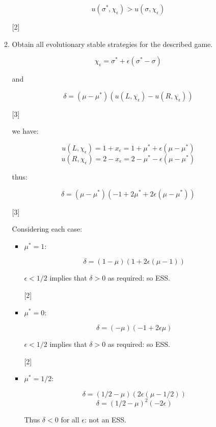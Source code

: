 \documentclass[12pt,a4paper]{article}
\begin{document}
\begin{enumerate}
\begin{enumerate}
                $$u(\sigma^*,\chi_\epsilon)>u(\sigma,\chi_\epsilon)$$

                \hfill{[2]}

            \item Obtain all evolutionary stable strategies for the described game.

                \[\chi_{\epsilon}=\sigma^*+\epsilon(\sigma^*-\sigma)\]

                and

                \[\delta=(\mu-\mu^*)(u(L,\chi_{\epsilon}) - u(R, \chi_{\epsilon}))\]

                \hfill{[3]}

                we have:

                \[u(L,\chi_{\epsilon})=1+x_{\epsilon}=1+\mu^*+\epsilon(\mu-\mu^*)\]
                \[u(R,\chi_{\epsilon})=2-x_{\epsilon}=2-\mu^*-\epsilon(\mu-\mu^*)\]

                thus:

                \[\delta=(\mu-\mu^*)(-1+2\mu^*+2\epsilon(\mu-\mu^*))\]

                \hfill{[3]}

                Considering each case:

                \begin{itemize}
                    \item \(\mu^*=1\):

                        \[\delta=(1-\mu)(1+2\epsilon(\mu-1))\]

                        \(\epsilon < 1/2\) implies that \(\delta>0\) as required: so ESS.

                \hfill{[2]}

                    \item \(\mu^*=0\):

                        \[\delta=(-\mu)(-1+2\epsilon\mu)\]

                        \(\epsilon < 1/2\) implies that \(\delta>0\) as required: so ESS.

                \hfill{[2]}

                    \item \(\mu^*=1/2\):

                        \[\delta=(1/2-\mu)(2\epsilon(\mu-1/2))\]
                        \[\delta=(1/2-\mu)^2(-2\epsilon)\]

                        Thus \(\delta<0\) for all \(\epsilon\): not an ESS.


\end{itemize}
\end{enumerate}
\end{enumerate}
\end{document}

